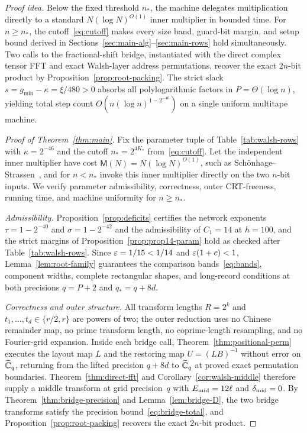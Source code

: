 \emph{Proof idea.} Below the fixed threshold $n_*$, the machine delegates multiplication directly to a standard
$N(\log N)^{O(1)}$ inner multiplier in bounded time. For $n\ge n_*$, the cutoff~\eqref{eq:cutoff} makes every size band,
guard-bit margin, and setup bound derived in Sections~\ref{sec:main-alg}--\ref{sec:main-rows} hold simultaneously. Two
calls to the fractional-shift bridge, instantiated with the direct complex tensor FFT and exact Walsh-layer address
permutations, recover the exact $2n$-bit product by Proposition~\ref{prop:root-packing}. The strict slack
$s=g_{\min}-\kappa=\xi/480>0$ absorbs all polylogarithmic factors in $P=\Theta(\log n)$, yielding total step count
$O(n(\log n)^{1-2^{-46}})$ on a single uniform multitape machine.

\begin{proof}[Proof of Theorem~\ref{thm:main}]
Fix the parameter tuple of Table~\ref{tab:walsh-rows} with $\kappa=2^{-46}$ and the cutoff $n_*=2^{4K_*}$
from~\eqref{eq:cutoff}. Let the independent inner multiplier have cost $\mathsf M(N)=N(\log N)^{O(1)}$, such as
Sch\"onhage--Strassen~\cite{SS71}, and for $n<n_*$ invoke this inner multiplier directly on the two $n$-bit inputs. We
verify parameter admissibility, correctness, outer CRT-freeness, running time, and machine uniformity for $n\ge n_*$.

\emph{Admissibility.} Proposition~\ref{prop:deficits} certifies the network exponents $\tau=1-2^{-40}$ and
$\sigma=1-2^{-42}$ and the admissibility of $C_1=14$ at $h=100$, and the strict margins of
Proposition~\ref{prop:prop14-param} hold as checked after Table~\ref{tab:walsh-rows}. Since $\varepsilon=1/15<1/14$ and
$\varepsilon(1+c)<1$, Lemma~\ref{lem:root-family} guarantees the comparison bands~\eqref{eq:bands}, component widths, complete
rectangular shapes, and long-record conditions at both precisions $q=P+2$ and $q_*=q+8d$.

\emph{Correctness and outer structure.} All transform lengths $R=2^k$ and $t_1,\dots,t_d\in\{r/2,r\}$ are powers of two;
the outer reduction uses no Chinese remainder map, no prime transform length, no coprime-length resampling, and no
Fourier-grid expansion. Inside each bridge call, Theorem~\ref{thm:positional-perm} executes the layout map $L$ and the
restoring map $U=(LB)^{-1}$ without error on $\widetilde{\mathbb{C}}_q$, returning from the lifted precision $q+8d$ to $\widetilde{\mathbb{C}}_q$ at proved
exact permutation boundaries. Theorem~\ref{thm:direct-fft} and Corollary~\ref{cor:walsh-middle} therefore supply a
middle transform at grid precision~$q$ with $E_{\rm mid}=12\ell$ and $\delta_{\rm mid}=0$. By
Theorem~\ref{thm:bridge-precision} and Lemma~\ref{lem:bridge-D}, the two bridge transforms satisfy the precision
bound~\eqref{eq:bridge-total}, and Proposition~\ref{prop:root-packing} recovers the exact $2n$-bit product.


\end{proof}
